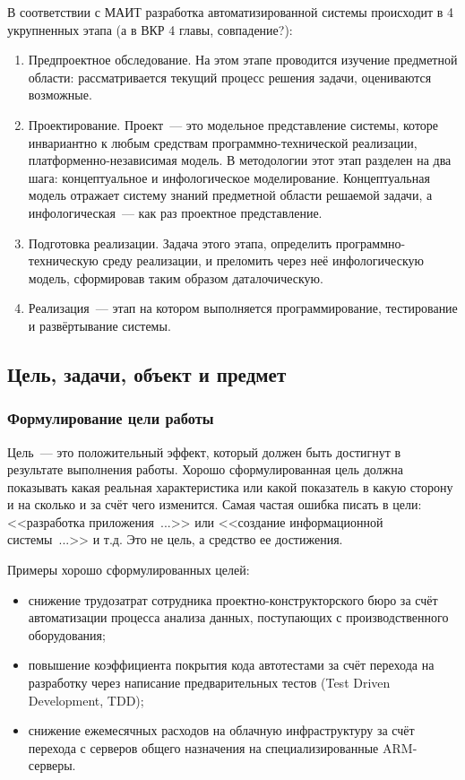 В соответствии с МАИТ разработка автоматизированной системы происходит в 4 укрупненных этапа (а в ВКР 4 главы, совпадение?):
\begin{enumerate}
	\item Предпроектное обследование. На этом этапе проводится изучение предметной области: рассматривается текущий процесс решения задачи, оцениваются возможные. 
	
	\item Проектирование. Проект~--- это модельное представление системы, которе инвариантно к любым средствам программно-технической реализации, платформенно-независимая модель. В методологии этот этап разделен на два шага: концептуальное и инфологическое моделирование. Концептуальная модель отражает систему знаний предметной области решаемой задачи, а инфологическая~--- как раз проектное представление.
	
	\item Подготовка реализации. Задача этого этапа, определить программно-техническую среду реализации, и преломить через неё инфологическую модель, сформировав таким образом даталочическую.
	
	\item Реализация~--- этап на котором выполняется программирование, тестирование и развёртывание системы.
	
\end{enumerate}  

\subsection{Цель, задачи, объект и предмет}

\subsubsection{Формулирование цели работы}

Цель~--- это положительный эффект, который должен быть достигнут в результате выполнения работы. Хорошо сформулированная цель должна показывать какая реальная характеристика или какой показатель в какую сторону и на сколько и за счёт чего изменится. Самая частая  ошибка писать в цели: <<разработка приложения~...>> или <<создание информационной системы~...>> и т.д. Это не цель, а средство ее достижения.

Примеры хорошо сформулированных целей:
\begin{itemize}
	\item снижение трудозатрат сотрудника проектно-конструкторского бюро за счёт автоматизации процесса анализа данных, поступающих с производственного оборудования;
	
	\item повышение коэффициента покрытия кода автотестами за счёт  перехода на разработку через написание предварительных тестов (Test Driven Development, TDD);
	
	\item снижение ежемесячных расходов на облачную инфраструктуру за счёт перехода с серверов общего назначения на специализированные ARM-серверы.
\end{itemize}


